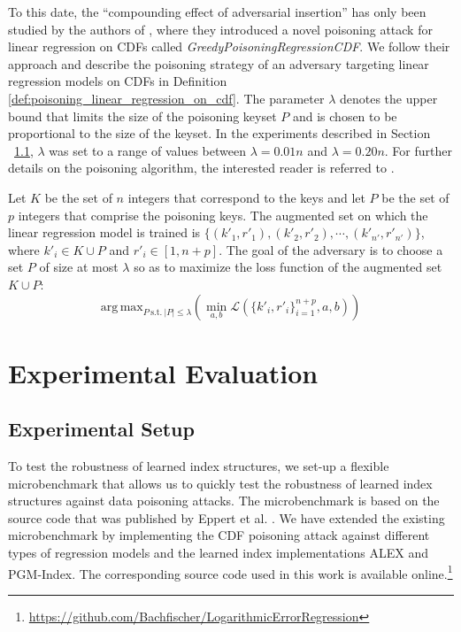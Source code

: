 \documentclass[sigconf]{acmart}
\newcommand{\argmax}{\mathrm{arg\,max}}
\begin{document}
To this date, the \enquote{compounding effect of adversarial insertion} has only been studied by the authors of \cite{RN415}, where they introduced a novel poisoning attack for linear regression on \acp{CDF} called \textit{GreedyPoisoningRegressionCDF}. We follow their approach and describe the poisoning strategy of an adversary targeting linear regression models on \acp{CDF} in Definition \ref{def:poisoning_linear_regression_on_cdf}. The parameter $\lambda$ denotes the upper bound that limits the size of the poisoning keyset $P$ and is chosen to be proportional to the size of the keyset. In the experiments described in Section ~\ref{sec:experimental_setup}, $\lambda$ was set to a range of values between $\lambda=0.01n$ and $\lambda=0.20n$. For further details on the poisoning algorithm, the interested reader is referred to \cite{RN415}.


\begin{mdframed}[style=FrameDefinition,nobreak=false,align=center]
\begin{definition}
    Let $K$ be the set of $n$ integers that correspond to the keys and let $P$ be the set of $p$ integers that comprise the poisoning keys. 
    The augmented set on which the linear regression model is trained is $\{(k'_1, r'_1), (k'_2, r'_2), \cdots, (k'_{n'}, r'_{n'})\}$, where $k'_i\in K\cup P$ and $r'_i \in [1,n+p]$. 
    The goal of the adversary is to choose a set $P$ of size at most $\lambda$ so as to maximize the loss function of the augmented set $K\cup P$:
    \[\argmax_{P\mathrm{~s.t.~}|P|\leq \lambda}\left(\min_{a,b}\mathcal{L}\left(\{k'_i,r'_i\}_{i=1}^{n+p},a,b\right)\right)\]
    \label{def:poisoning_linear_regression_on_cdf}
\end{definition}
\end{mdframed}

\section{Experimental Evaluation}

\subsection{Experimental Setup}
\label{sec:experimental_setup}
To test the robustness of learned index structures, we set-up a flexible microbenchmark that allows us to quickly test the robustness of learned index structures against data poisoning attacks. The microbenchmark is based on the source code that was published by Eppert et al. \cite{RN696}. We have extended the existing microbenchmark by implementing the \ac{CDF} poisoning attack against different types of regression models and the learned index implementations \ac{ALEX} and \ac{PGM}-Index. The corresponding source code used in this work is available online.\footnote{\url{https://github.com/Bachfischer/LogarithmicErrorRegression}}
\end{document}

